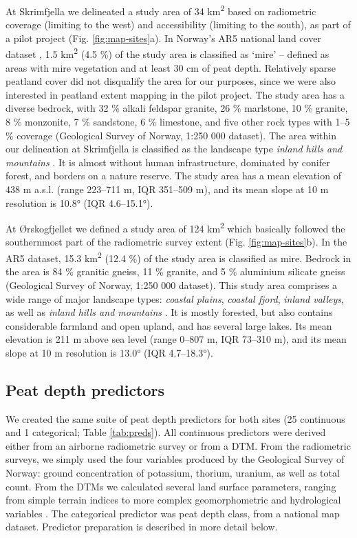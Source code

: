 \documentclass[soil, manuscript]{copernicus}
\begin{document}
At Skrimfjella we delineated a study area of 34 km\textsuperscript{2} based on radiometric coverage (limiting to the west) and accessibility (limiting to the south), as part of a pilot project (Fig. \ref{fig:map-sites}a).
In Norway's AR5 national land cover dataset \citep[``areal resources in scale 1:5000'',][]{ahlstromAR5Klassifikasjonssystem2019}, 1.5 km\textsuperscript{2} (4.5 \%) of the study area is classified as `mire' -- defined as areas with mire vegetation and at least 30 cm of peat depth.
Relatively sparse peatland cover did not disqualify the area for our purposes, since we were also interested in peatland extent mapping in the pilot project.
The study area has a diverse bedrock, with 32 \% alkali feldspar granite, 26 \% marlstone, 10 \% granite, 8 \% monzonite, 7 \% sandstone, 6 \% limestone, and five other rock types with 1--5 \% coverage (Geological Survey of Norway, 1:250 000 dataset).
The area within our delineation at Skrimfjella is classified as the landscape type \emph{inland hills and mountains} \citep{simensenDiversityDistributionLandscape2021}.
It is almost without human infrastructure, dominated by conifer forest, and borders on a nature reserve.
The study area has a mean elevation of 438 m a.s.l. (range 223--711 m, IQR 351--509 m), and its mean slope at 10 m resolution is 10.8° (IQR 4.6--15.1°).

At Ørskogfjellet we defined a study area of 124 km\textsuperscript{2} which basically followed the southernmost part of the radiometric survey extent (Fig. \ref{fig:map-sites}b).
In the AR5 dataset, 15.3 km\textsuperscript{2} (12.4 \%) of the study area is classified as mire.
Bedrock in the area is 84 \% granitic gneiss, 11 \% granite, and 5 \% aluminium silicate gneiss (Geological Survey of Norway, 1:250 000 dataset).
This study area comprises a wide range of major landscape types: \emph{coastal plains}, \emph{coastal fjord}, \emph{inland valleys}, as well as \emph{inland hills and mountains} \citep{simensenDiversityDistributionLandscape2021}.
It is mostly forested, but also contains considerable farmland and open upland, and has several large lakes.
Its mean elevation is 211 m above sea level (range 0--807 m, IQR 73--310 m), and its mean slope at 10 m resolution is 13.0° (IQR 4.7--18.3°).

\subsection{Peat depth predictors}

We created the same suite of peat depth predictors for both sites (25 continuous and 1 categorical; Table \ref{tab:preds}).
All continuous predictors were derived either from an airborne radiometric survey or from a DTM.
From the radiometric surveys, we simply used the four variables produced by the Geological Survey of Norway: ground concentration of potassium, thorium, uranium, as well as total count.
From the DTMs we calculated several land surface parameters, ranging from simple terrain indices to more complex geomorphometric and hydrological variables \citep{maxwellLandsurfaceParametersSpatial2022}.
The categorical predictor was peat depth class, from a national map dataset.
Predictor preparation is described in more detail below.
\end{document}
